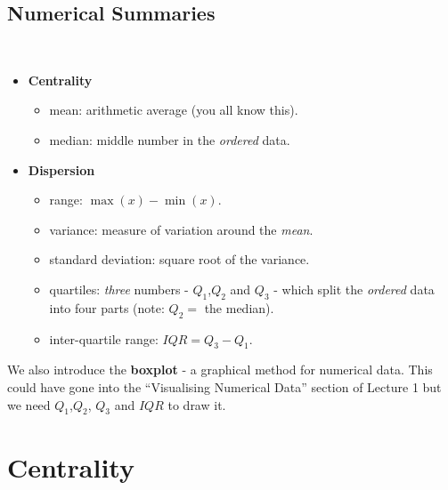 \subsection{Numerical Summaries}
\begin{frame}{\bf {}\\[-1cm]}
\begin{itemize}\itemsep0.3cm
\item {\bf Centrality}
\begin{itemize}\itemsep0.2cm
\item mean: arithmetic average (you all know this).
\item median: middle number in the \emph{ordered} data.
\end{itemize}
\item {\bf Dispersion}
\begin{itemize}\itemsep0.2cm
\item range: $\max(x) -\min(x)$.
\item variance: measure of variation around the \emph{mean}.
\item standard deviation: square root of the variance.
\item quartiles: \emph{three} numbers - $Q_1$,$Q_2$ and $Q_3$ - which split the \emph{ordered}\newline\phantom{quartiles:} data into four parts (note: $Q_2 =$ the median).
\item inter-quartile range: $IQR = Q_3 - Q_1$.\\[0.4cm]
\end{itemize}
\end{itemize}
We also introduce the {\bf boxplot} - a graphical method for numerical data. This could have gone into the ``Visualising Numerical Data'' section of Lecture 1 but we need $Q_1$,$Q_2$, $Q_3$ and $IQR$ to draw it.
\end{frame}


\section{Centrality}
